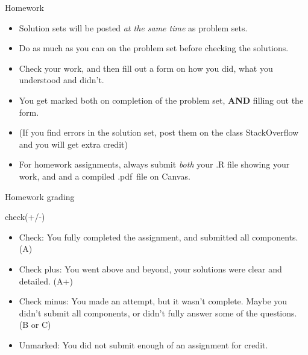 \documentclass[xcolor={dvipsnames}]{beamer}
\begin{document}
\begin{frame}{Homework}

\begin{itemize}
\item Solution sets will be posted \textit{at the same time} as problem sets. \pause
\item Do as much as you can on the problem set before checking the solutions. \pause
\item Check your work, and then fill out a form on how you did, what you understood and didn't.\pause
\item You get marked both on completion of the problem set, \textbf{AND} filling out the form.\pause
\item (If you find errors in the solution set, post them on the class StackOverflow and you will get extra credit) \pause
\item For homework assignments, always submit \textit{both} your .R file showing your work, and and a compiled .pdf\ file on Canvas.
\end{itemize}

\end{frame}




\begin{frame}{Homework grading}

check(+/-) \pause
\begin{itemize}
\item Check: You fully completed the assignment, and submitted all components. (A) \pause
\item Check plus: You went above and beyond, your solutions were clear and detailed. (A+)  \pause
\item Check minus: You made an attempt, but it wasn't complete. Maybe you didn't submit all components, or didn't fully answer some of the questions. (B or C) \pause
\item Unmarked: You did not submit enough of an assignment for credit. 
\end{itemize}

\end{frame}
\end{document}
